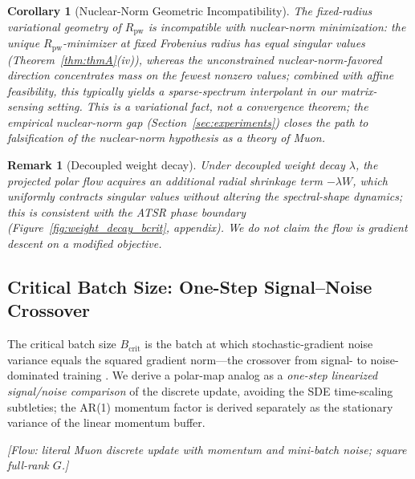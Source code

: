 \documentclass{article}
\newtheorem{corollary}{Corollary}
\newtheorem{remark}{Remark}
\begin{document}
\begin{corollary}[Nuclear-Norm Geometric Incompatibility]
\label{cor:nuclear_norm}
The fixed-radius variational geometry of $R_{\mathrm{pw}}$ is incompatible with nuclear-norm minimization: the unique $R_{\mathrm{pw}}$-minimizer at fixed Frobenius radius has equal singular values (Theorem~\ref{thm:thmA}(iv)), whereas the unconstrained nuclear-norm-favored direction concentrates mass on the fewest nonzero values; combined with affine feasibility, this typically yields a sparse-spectrum interpolant in our matrix-sensing setting. This is a variational fact, not a convergence theorem; the empirical nuclear-norm gap (Section~\ref{sec:experiments}) closes the path to falsification of the nuclear-norm hypothesis as a theory of Muon.
\end{corollary}

\begin{remark}[Decoupled weight decay]
\label{cor:weight_decay}
Under decoupled weight decay $\lambda$, the projected polar flow acquires an additional radial shrinkage term $-\lambda W$, which uniformly contracts singular values without altering the spectral-shape dynamics; this is consistent with the ATSR phase boundary (Figure~\ref{fig:weight_decay_bcrit}, appendix). We do not claim the flow is gradient descent on a modified objective.
\end{remark}

\subsection{Critical Batch Size: One-Step Signal--Noise Crossover}
\label{sec:theory:thmB}

The critical batch size $B_{\mathrm{crit}}$ is the batch at which stochastic-gradient noise variance equals the squared gradient norm---the crossover from signal- to noise-dominated training \citep{mccandlish2018empirical}. We derive a polar-map analog as a \emph{one-step linearized signal/noise comparison} of the discrete update, avoiding the SDE time-scaling subtleties; the AR(1) momentum factor is derived separately as the stationary variance of the linear momentum buffer.

\noindent\textit{[Flow: literal Muon discrete update with momentum and mini-batch noise; square full-rank $G$.]}
\end{document}
